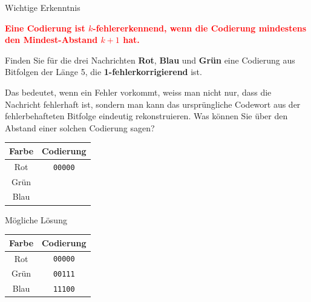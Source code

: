 \begin{frame}[fragile]{Wichtige Erkenntnis}
    \begin{center}
        \textcolor{red}{\textbf{Eine Codierung ist $k$-fehlererkennend, wenn die Codierung mindestens den Mindest-Abstand $k+1$ hat.}}
    \end{center}
\end{frame}


\begin{frame}
    \begin{tcolorboxTemplate}[
            title=\faEdit{} \theexercisename,
            parbox=false,
            colback=RoyalBlue!10,
            colframe=RoyalBlue,
            colbacktitle=RoyalBlue]
        Finden Sie für die drei Nachrichten \textbf{Rot}, \textbf{Blau} und \textbf{Grün} eine Codierung aus Bitfolgen der Länge 5, die \textbf{1-fehlerkorrigierend} ist.

        Das bedeutet, wenn ein Fehler vorkommt, weiss man nicht nur, dass die Nachricht fehlerhaft ist, sondern man kann das ursprüngliche Codewort aus der fehlerbehafteten Bitfolge eindeutig rekonstruieren. Was können Sie über den Abstand einer solchen Codierung sagen?

        \begin{table}[H]
            \centering
            \small %
            \begin{tabular}{cc}
                \textbf{Farbe} & \textbf{Codierung} \\\midrule
                Rot            & \texttt{00000}     \\\midrule
                Grün           &                    \\\midrule
                Blau           &                    \\
            \end{tabular}
        \end{table}
    \end{tcolorboxTemplate}
\end{frame}

\begin{frame}[fragile]{Mögliche Lösung}
    \begin{table}[H]
            \centering
            \begin{tabular}{cc}
                \textbf{Farbe} & \textbf{Codierung} \\\midrule
                Rot            & \texttt{00000}     \\\midrule
                Grün           & \texttt{00111}     \\\midrule
                Blau           & \texttt{11100}     \\
            \end{tabular}
        \end{table}
\end{frame}

